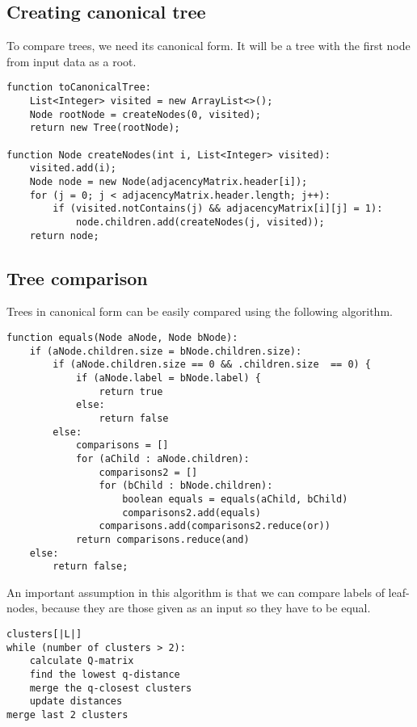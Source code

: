 \documentclass[a4paper,10pt]{article}
\begin{document}
\subsection{Creating canonical tree}
To compare trees, we need its canonical form. It will be a tree with the first node from input data as a root.
\begin{lstlisting}[caption={Tree to adjacency matrix.}]
function toCanonicalTree:
    List<Integer> visited = new ArrayList<>();
    Node rootNode = createNodes(0, visited);
    return new Tree(rootNode);

function Node createNodes(int i, List<Integer> visited):
    visited.add(i);
    Node node = new Node(adjacencyMatrix.header[i]);
    for (j = 0; j < adjacencyMatrix.header.length; j++):
        if (visited.notContains(j) && adjacencyMatrix[i][j] = 1):
            node.children.add(createNodes(j, visited));
    return node;
\end{lstlisting}

\subsection{Tree comparison}
Trees in canonical form can be easily compared using the following algorithm.
\begin{lstlisting}[caption={Comparing trees.}]
function equals(Node aNode, Node bNode):
    if (aNode.children.size = bNode.children.size):
        if (aNode.children.size == 0 && .children.size  == 0) {
            if (aNode.label = bNode.label) {
                return true
            else:
                return false
        else:
            comparisons = []
            for (aChild : aNode.children):
                comparisons2 = []
                for (bChild : bNode.children):
                    boolean equals = equals(aChild, bChild)
                    comparisons2.add(equals)
                comparisons.add(comparisons2.reduce(or))
            return comparisons.reduce(and)
    else:
        return false;
\end{lstlisting}
An important assumption in this algorithm is that we can compare labels of leaf-nodes, because they are those given as an input so they have to be equal.

\begin{lstlisting}[caption={NJ pseudocode}]
clusters[|L|]
while (number of clusters > 2):
    calculate Q-matrix
    find the lowest q-distance
    merge the q-closest clusters
    update distances
merge last 2 clusters
\end{lstlisting}
\end{document}
